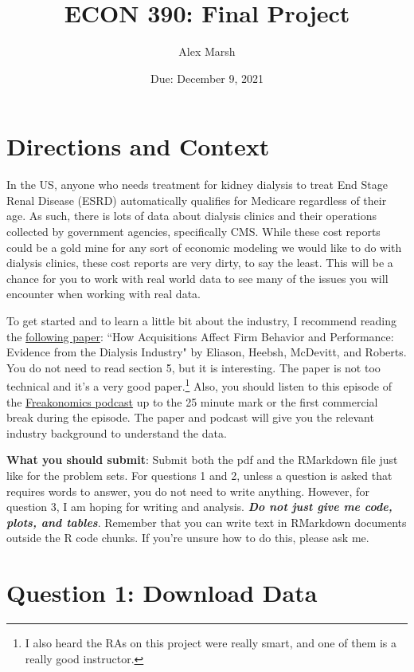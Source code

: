 \documentclass{article}
\title{ECON 390: Final Project}
\author{Alex Marsh}
\date{Due: December 9, 2021}
\begin{document}
\maketitle

\section*{Directions and Context}

In the US, anyone who needs treatment for kidney dialysis to treat End Stage Renal Disease (ESRD) automatically qualifies for Medicare regardless of their age. As such, there is lots of data about dialysis clinics and their operations collected by government agencies, specifically CMS. While these cost reports could be a gold mine for any sort of economic modeling we would like to do with dialysis clinics, these cost reports are very dirty, to say the least. This will be a chance for you to work with real world data to see many of the issues you will encounter when working with real data.

	To get started and to learn a little bit about the industry, I recommend reading the \href{https://academic.oup.com/qje/article-abstract/135/1/221/5607794?redirectedFrom=fulltext}{following paper}: ``How Acquisitions Affect Firm Behavior and Performance: Evidence from the Dialysis Industry" by Eliason, Heebsh, McDevitt, and Roberts. You do not need to read section 5, but it is interesting. The paper is not too technical and it's a very good paper.\footnote{I also heard the RAs on this project were really smart, and one of them is a really good instructor.} Also, you should listen to this episode of the \href{https://freakonomics.com/podcast/dialysis/}{Freakonomics podcast} up to the 25 minute mark or the first commercial break during the episode. The paper and podcast will give you the relevant industry background to understand the data.
	
	\textbf{What you should submit}: Submit both the pdf and the RMarkdown file just like for the problem sets. For questions 1 and 2, unless a question is asked that requires words to answer, you do not need to write anything. However, for question 3, I am hoping for writing and analysis. \textit{\textbf{Do not just give me code, plots, and tables}}. Remember that you can write text in RMarkdown documents outside the R code chunks. If you're unsure how to do this, please ask me.

\section*{Question 1: Download Data}
\end{document}

